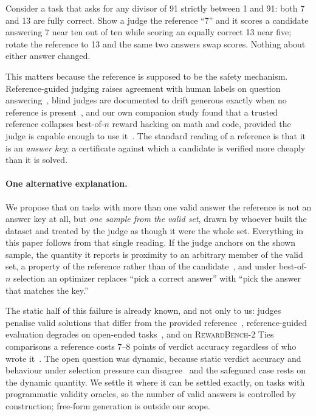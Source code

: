 \documentclass[11pt]{article}
\begin{document}
Consider a task that asks for any divisor of 91 strictly between 1 and 91: both 7 and 13 are fully correct.
Show a judge the reference ``7'' and it scores a candidate answering 7 near ten out of ten while scoring an equally correct 13 near five; rotate the reference to 13 and the same two answers swap scores.
Nothing about either answer changed.

This matters because the reference is supposed to be the safety mechanism.
Reference-guided judging raises agreement with human labels on question answering~\cite{refguided2024}, blind judges are documented to drift generous exactly when no reference is present~\cite{generous2026}, and our own companion study found that a trusted reference collapses best-of-$n$ reward hacking on math and code, provided the judge is capable enough to use it~\cite{companionA}.
The standard reading of a reference is that it is an \emph{answer key}: a certificate against which a candidate is verified more cheaply than it is solved.

\paragraph{One alternative explanation.}
We propose that on tasks with more than one valid answer the reference is not an answer key at all, but \emph{one sample from the valid set}, drawn by whoever built the dataset and treated by the judge as though it were the whole set.
Everything in this paper follows from that single reading.
If the judge anchors on the shown sample, the quantity it reports is proximity to an arbitrary member of the valid set, a property of the reference rather than of the candidate~\cite{companionB}, and under best-of-$n$ selection an optimizer replaces ``pick a correct answer'' with ``pick the answer that matches the key.''

The static half of this failure is already known, and not only to us: judges penalise valid solutions that differ from the provided reference~\cite{fixation2025}, reference-guided evaluation degrades on open-ended tasks~\cite{judgingref2026}, and on \textsc{RewardBench-2} Ties comparisons a reference costs $7$--$8$ points of verdict accuracy regardless of who wrote it~\cite{companionA,malik2025rewardbench2}.
The open question was dynamic, because static verdict accuracy and behaviour under selection pressure can disagree~\cite{gao2022scaling} and the safeguard case rests on the dynamic quantity.
We settle it where it can be settled exactly, on tasks with programmatic validity oracles, so the number of valid answers is controlled by construction; free-form generation is outside our scope.
\end{document}
